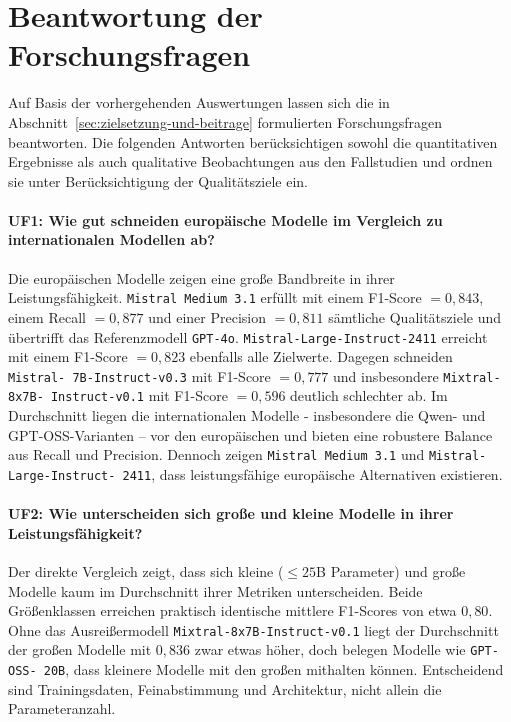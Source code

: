\section{Beantwortung der Forschungsfragen}\label{sec:antworten-auf-forschungsfragen}

Auf Basis der vorhergehenden Auswertungen lassen sich die in Abschnitt~\ref{sec:zielsetzung-und-beitrage} formulierten Forschungsfragen beantworten. Die folgenden Antworten berücksichtigen sowohl die quantitativen Ergebnisse als auch qualitative Beobachtungen aus den Fallstudien und ordnen sie unter Berücksichtigung der Qualitätsziele ein.

\paragraph{UF1: Wie gut schneiden europäische Modelle im Vergleich zu internationalen Modellen ab?}

Die europäischen Modelle zeigen eine große Bandbreite in ihrer Leistungsfähigkeit. \texttt{Mistral Medium 3.1} erfüllt mit einem F1-Score $= 0{,}843$, einem Recall $= 0{,}877$ und einer Precision $= 0{,}811$ sämtliche Qualitätsziele und übertrifft das Referenzmodell \texttt{GPT-4o}. \texttt{Mistral-Large-Instruct-2411} erreicht mit einem F1-Score $= 0{,}823$ ebenfalls alle Zielwerte. Dagegen schneiden \texttt{Mistral-\linebreak~7B-Instruct-v0.3} mit F1-Score $= 0{,}777$ und insbesondere \texttt{Mixtral-8x7B-\linebreak~Instruct-v0.1} mit F1-Score $= 0{,}596$ deutlich schlechter ab. Im Durchschnitt liegen die internationalen Modelle - insbesondere die Qwen- und GPT-OSS-Varianten – vor den europäischen und bieten eine robustere Balance aus Recall und Precision. Dennoch zeigen \texttt{Mistral Medium 3.1} und \texttt{Mistral-Large-Instruct-\linebreak~2411}, dass leistungsfähige europäische Alternativen existieren.

\paragraph{UF2: Wie unterscheiden sich große und kleine Modelle in ihrer Leistungsfähigkeit?}

Der direkte Vergleich zeigt, dass sich kleine ($\leq 25$B Parameter) und große Modelle kaum im Durchschnitt ihrer Metriken unterscheiden. Beide Größenklassen erreichen praktisch identische mittlere F1-Scores von etwa $0{,}80$. Ohne das Ausreißermodell \texttt{Mixtral-8x7B-Instruct-v0.1} liegt der Durchschnitt der großen Modelle mit $0{,}836$ zwar etwas höher, doch belegen Modelle wie \texttt{GPT-OSS-\linebreak~20B}, dass kleinere Modelle mit den großen mithalten können. Entscheidend sind Trainingsdaten, Feinabstimmung und Architektur, nicht allein die Parameteranzahl.

